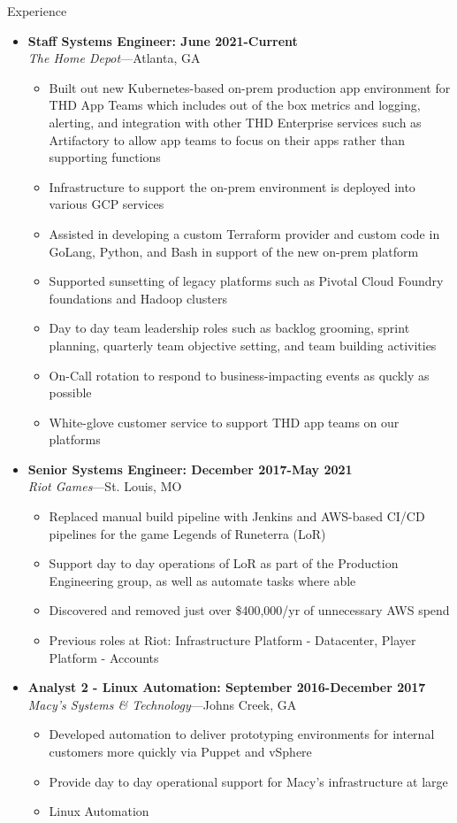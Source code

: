 \documentclass[10pt,oneside]{article}
\newenvironment{ressection}[1]{
    \vspace{4pt}
    {\fontfamily{phv}\selectfont\Large#1}
    \begin{itemize}
    \vspace{3pt}
}{
    \end{itemize}
}
\newcommand{\ressubitem}[1]{
    \vspace{-1pt}
    \item \begin{flushleft} #1 \end{flushleft}
}
\newcommand{\resbigitem}[3]{
    \vspace{-5pt}
    \item
    \textbf{#3} \\
    \textit{#1}---#2
}
\newenvironment{ressubsec}[3]{
    \resbigitem{#1}{#2}{#3}
    \vspace{-2pt}
    \begin{itemize}
}{
    \end{itemize}
}
\begin{document}
\begin{ressection}{Experience}
    \begin{ressubsec}{The Home Depot}{Atlanta, GA}{Staff Systems Engineer: June 2021-Current}
        \ressubitem{Built out new Kubernetes-based on-prem production app environment for THD App Teams which includes out of the box metrics and logging, alerting, and integration with other THD Enterprise services such as Artifactory to allow app teams to focus on their apps rather than supporting functions}
        \ressubitem{Infrastructure to support the on-prem environment is deployed into various GCP services}
        \ressubitem{Assisted in developing a custom Terraform provider and custom code in GoLang, Python, and Bash in support of the new on-prem platform}
        \ressubitem{Supported sunsetting of legacy platforms such as Pivotal Cloud Foundry foundations and Hadoop clusters}
        \ressubitem{Day to day team leadership roles such as backlog grooming, sprint planning, quarterly team objective setting, and team building activities}
        \ressubitem{On-Call rotation to respond to business-impacting events as quckly as possible}
        \ressubitem{White-glove customer service to support THD app teams on our platforms}
    \end{ressubsec}

    \begin{ressubsec}{Riot Games}{St. Louis, MO}{Senior Systems Engineer: December 2017-May 2021}
        \ressubitem{Replaced manual build pipeline with Jenkins and AWS-based CI/CD pipelines for the game Legends of Runeterra (LoR)}
        \ressubitem{Support day to day operations of LoR as part of the Production Engineering group, as well as automate tasks where able}
        \ressubitem{Discovered and removed just over \$400,000/yr of unnecessary AWS spend}
        \ressubitem{Previous roles at Riot: Infrastructure Platform - Datacenter, Player Platform - Accounts}
    \end{ressubsec}

    \begin{ressubsec}{Macy's Systems \& Technology}{Johns Creek, GA}{Analyst 2 - Linux Automation: September 2016-December 2017}
        \ressubitem{Developed automation to deliver prototyping environments for internal customers more quickly via Puppet and vSphere}
        \ressubitem{Provide day to day operational support for Macy's infrastructure at large}
        \ressubitem{Linux Automation}
    \end{ressubsec}


\end{ressection}
\end{document}
